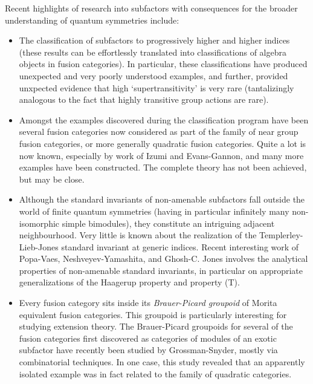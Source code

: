 \documentclass[12pt]{article}
\begin{document}
Recent highlights of research into subfactors with consequences for the broader understanding of quantum symmetries include:
\begin{itemize}
  \setlength{\itemsep}{1pt}
  \setlength{\parskip}{0pt}
  \setlength{\parsep}{0pt}
\item The classification of subfactors to progressively higher and higher indices (these results can be effortlessly translated into classifications of algebra objects in fusion categories). In particular, these classifications have produced unexpected and very poorly understood examples, and further, provided unxpected evidence that high `supertransitivity' is very rare (tantalizingly analogous to the fact that highly transitive group actions are rare).
\item Amongst the examples discovered during the classification program have been several fusion categories now considered as part of the family of near group fusion categories, or more generally quadratic fusion categories. Quite a lot is now known, especially by work of Izumi and Evans-Gannon, and many more examples have been constructed. The complete theory has not been achieved, but may be close.
\item Although the standard invariants of non-amenable subfactors fall outside the world of finite quantum symmetries (having in particular infinitely many non-isomorphic simple bimodules), they constitute an intriguing adjacent neighbourhood. Very little is known about the realization of the Templerley-Lieb-Jones standard invariant at generic indices. Recent interesting work of Popa-Vaes, Neshveyev-Yamashita, and Ghosh-C. Jones involves the analytical properties of non-amenable standard invariants, in particular on appropriate generalizations of the Haagerup property and property (T). 
\item Every fusion category sits inside its \emph{Brauer-Picard groupoid} of Morita equivalent fusion categories. This groupoid is particularly interesting for studying extension theory. The Brauer-Picard groupoids for several of the fusion categories first discovered as categories of modules of an exotic subfactor have recently been studied by Grossman-Snyder, mostly via combinatorial techniques. In one case, this study revealed that an apparently isolated example was in fact related to the family of quadratic categories.
\end{itemize}
\end{document}
